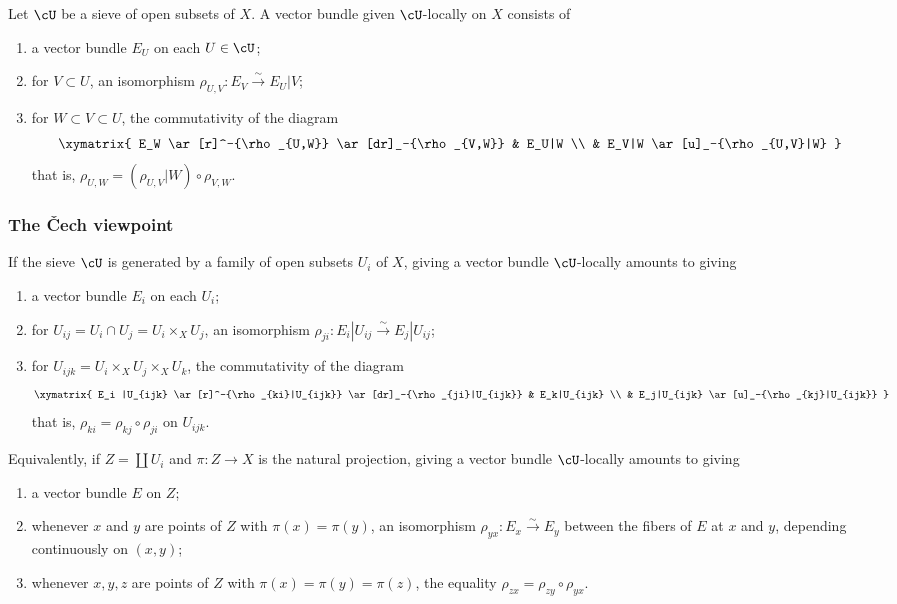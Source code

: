 \documentclass[12pt,oneside,english]{smfbook}
\newcommand{\iso}{\xrightarrow\sim}
\begin{document}
Let $\cU$ be a sieve of open subsets of $X$. A vector bundle given $\cU$-locally on $X$ consists of
\begin{enumerate}[\indent a)]
  \item a vector bundle $E_U$ on each $U\in\cU$;
  \item for $V\subset U$, an isomorphism $\rho_{U,V}:E_V\iso E_U|V$;
  \item for $W\subset V\subset U$, the commutativity of the diagram
    \[\xymatrix{
      E_W \ar[r]^-{\rho_{U,W}} \ar[dr]_-{\rho_{V,W}}
        & E_U|W \\
      & E_V|W \ar[u]_-{\rho_{U,V}|W}
    }\]
    that is, $\rho_{U,W}=(\rho_{U,V}|W)\circ\rho_{V,W}$.
\end{enumerate}

\subsubsection{The Čech viewpoint}\label{I:1-3-2}

If the sieve $\cU$ is generated by a family of open subsets $U_i$ of $X$, giving a vector bundle $\cU$-locally amounts to giving
\begin{enumerate}[\indent a)]
  \item a vector bundle $E_i$ on each $U_i$;
  \item for $U_{ij}=U_i\cap U_j=U_i\times_XU_j$, an isomorphism $\rho_{ji}:E_i|U_{ij}\iso E_j|U_{ij}$;
  \item for $U_{ijk}=U_i\times_XU_j\times_XU_k$, the commutativity of the diagram
    \[\xymatrix{
      E_i |U_{ijk} \ar[r]^-{\rho_{ki}|U_{ijk}} \ar[dr]_-{\rho_{ji}|U_{ijk}}
        & E_k|U_{ijk} \\
      & E_j|U_{ijk} \ar[u]_-{\rho_{kj}|U_{ijk}}
    }\]
    that is, $\rho_{ki}=\rho_{kj}\circ\rho_{ji}$ on $U_{ijk}$.
\end{enumerate}

Equivalently, if $Z=\coprod U_i$ and $\pi:Z\to X$ is the natural projection, giving a vector bundle $\cU$-locally amounts to giving
\begin{enumerate}[\indent a)]
  \item a vector bundle $E$ on $Z$;
  \item whenever $x$ and $y$ are points of $Z$ with $\pi(x)=\pi(y)$, an isomorphism $\rho_{yx}:E_x\iso E_y$ between the fibers of $E$ at $x$ and $y$, depending continuously on $(x,y)$;
  \item whenever $x,y,z$ are points of $Z$ with $\pi(x)=\pi(y)=\pi(z)$, the equality $\rho_{zx}=\rho_{zy}\circ\rho_{yx}$.
\end{enumerate}
\end{document}
